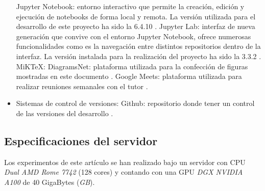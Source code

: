 \begin{itemize}
                    \subitem Jupyter Notebook: entorno interactivo que permite la creación, edición y ejecución de notebooks de forma local y remota. La versión utilizada para el desarrollo de este proyecto ha sido la 6.4.10 \cite{JupyterNotebook}.
                    \subitem Jupyter Lab: interfaz de nueva generación que convive con el entorno Jupyter Notebook, ofrece numerosas funcionalidades como es la navegación entre distintos repositorios dentro de la interfaz. La versión instalada para la realización del proyecto ha sido la 3.3.2 \cite{JupyterLab}.
                    \subitem MiKTeX:
                    \subitem DiagramsNet: plataforma utilizada para la confección de figuras mostradas en este documento \cite{DiagramsNet}. 
                    \subitem Google Meets: plataforma utilizada para realizar reuniones semanales con el tutor \cite{GoogleMeet}.
                \item Sistemas de control de versiones:
                    \subitem Github: repositorio donde tener un control de las versiones del desarrollo \cite{Github}.
                    
            \end{itemize}


        \subsection{Especificaciones del servidor}
            Los experimentos de este artículo se han realizado bajo un servidor con CPU \textit{Dual AMD Rome 7742} (128 cores) y contando con una GPU \textit{DGX NVIDIA A100} de  40 GigaBytes (\textit{GB}).
            